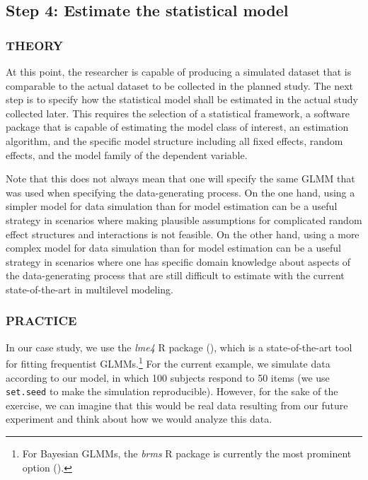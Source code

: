 \documentclass[
  man,
  floatsintext,
  longtable,
  a4paper,
  nolmodern,
  notxfonts,
  notimes,
  colorlinks=true,linkcolor=blue,citecolor=blue,urlcolor=blue]{apa7}
\begin{document}
\subsection{Step 4: Estimate the statistical
model}\label{step-4-estimate-the-statistical-model}

\subsubsection{THEORY}\label{theory-6}

At this point, the researcher is capable of producing a simulated
dataset that is comparable to the actual dataset to be collected in the
planned study. The next step is to specify how the statistical model
shall be estimated in the actual study collected later. This requires
the selection of a statistical framework, a software package that is
capable of estimating the model class of interest, an estimation
algorithm, and the specific model structure including all fixed effects,
random effects, and the model family of the dependent variable.

Note that this does not always mean that one will specify the same GLMM
that was used when specifying the data-generating process. On the one
hand, using a simpler model for data simulation than for model
estimation can be a useful strategy in scenarios where making plausible
assumptions for complicated random effect structures and interactions is
not feasible. On the other hand, using a more complex model for data
simulation than for model estimation can be a useful strategy in
scenarios where one has specific domain knowledge about aspects of the
data-generating process that are still difficult to estimate with the
current state-of-the-art in multilevel modeling.

\subsubsection{PRACTICE}\label{practice-6}

In our case study, we use the \emph{lme4} R package
(),
which is a state-of-the-art tool for fitting frequentist
GLMMs.\footnote{For Bayesian GLMMs, the \emph{brms} R package is
  currently the most prominent option
  ().} For
the current example, we simulate data according to our model, in which
100 subjects respond to 50 items (we use \texttt{set.seed} to make the
simulation reproducible). However, for the sake of the exercise, we can
imagine that this would be real data resulting from our future
experiment and think about how we would analyze this data.
\end{document}
